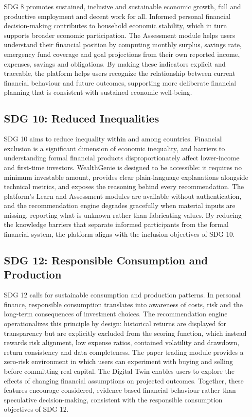 SDG 8 promotes sustained, inclusive and sustainable economic growth, full and productive employment and decent work for all. Informed personal financial decision-making contributes to household economic stability, which in turn supports broader economic participation. The Assessment module helps users understand their financial position by computing monthly surplus, savings rate, emergency fund coverage and goal projections from their own reported income, expenses, savings and obligations. By making these indicators explicit and traceable, the platform helps users recognize the relationship between current financial behaviour and future outcomes, supporting more deliberate financial planning that is consistent with sustained economic well-being.

\subsection{SDG 10: Reduced Inequalities}

SDG 10 aims to reduce inequality within and among countries. Financial exclusion is a significant dimension of economic inequality, and barriers to understanding formal financial products disproportionately affect lower-income and first-time investors. WealthGenie is designed to be accessible: it requires no minimum investable amount, provides clear plain-language explanations alongside technical metrics, and exposes the reasoning behind every recommendation. The platform's Learn and Assessment modules are available without authentication, and the recommendation engine degrades gracefully when material inputs are missing, reporting what is unknown rather than fabricating values. By reducing the knowledge barriers that separate informed participants from the formal financial system, the platform aligns with the inclusion objectives of SDG 10.

\subsection{SDG 12: Responsible Consumption and Production}

SDG 12 calls for sustainable consumption and production patterns. In personal finance, responsible consumption translates into awareness of costs, risk and the long-term consequences of investment choices. The recommendation engine operationalizes this principle by design: historical returns are displayed for transparency but are explicitly excluded from the scoring function, which instead rewards risk alignment, low expense ratios, contained volatility and drawdown, return consistency and data completeness. The paper trading module provides a zero-risk environment in which users can experiment with buying and selling before committing real capital. The Digital Twin enables users to explore the effects of changing financial assumptions on projected outcomes. Together, these features encourage considered, evidence-based financial behaviour rather than speculative decision-making, consistent with the responsible consumption objectives of SDG 12.